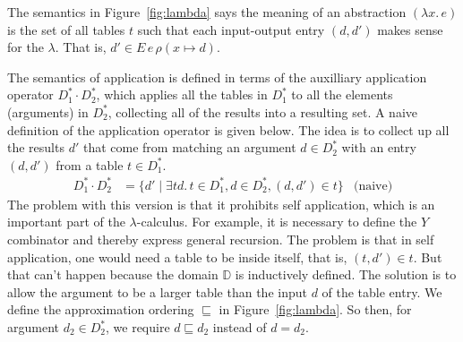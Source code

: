 \documentclass{tufte-handout}
\newcommand{\LAM}[1]{\lambda #1.\,}
\newcommand{\ext}[3]{#3(#1{\mapsto}#2)}
\begin{document}
The semantics in Figure~\ref{fig:lambda} says the meaning of an
abstraction $(\LAM{x}e)$ is the set of all tables $t$ such that each
input-output entry $(d,d')$ makes sense for the $\lambda$. That is,
$d' \in E\,e\,\ext{x}{ d}{\rho}$. 

The semantics of application is defined in terms of the auxilliary
application operator $D^{*}_1 \cdot D^{*}_2$, which applies all the
tables in $D^{*}_1$ to all the elements (arguments) in $D^{*}_2$,
collecting all of the results into a resulting set.  A naive
definition of the application operator is given below. The idea is to
collect up all the results $d'$ that come from matching an argument $d
\in D^{*}_2$ with an entry $(d,d')$ from a table $t \in D^{*}_1$.
\begin{align*}
  D^{*}_1 \cdot D^{*}_2 &= 
  \{ d' \mid
  \exists t d.\, t \in D^{*}_1, d \in D^{*}_2, 
    (d,d') \in t
  \}
  & \text{(naive)}
\end{align*}
The problem with this version is that it prohibits self application,
which is an important part of the $\lambda$-calculus.  For example, it
is necessary to define the $Y$ combinator and thereby express general
recursion. The problem is that in self application, one would need a
table to be inside itself, that is, $(t,d') \in t$.  But that can't
happen because the domain $\mathbb{D}$ is inductively defined. The
solution is to allow the argument to be a larger table than the input
$d$ of the table entry. We define the approximation ordering
$\sqsubseteq$ in Figure~\ref{fig:lambda}.  So then, for argument $d_2
\in D^{*}_2$, we require $d \sqsubseteq d_2$ instead of $d = d_2$.

\end{document}
